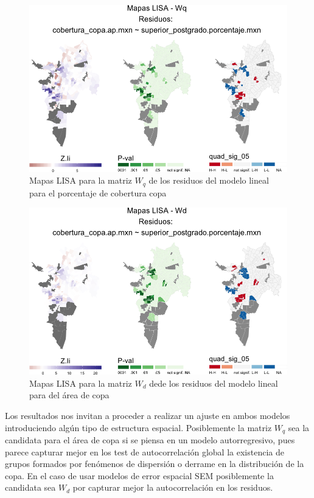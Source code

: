 \documentclass[12pt,]{book}
\begin{document}
\begin{figure}
\includegraphics[width=1\linewidth]{tesis-unigis_files/figure-latex/mapas-lisa-rescopaap-wq-1} \caption{Mapas LISA para la matriz $W_q$ de los residuos del modelo lineal para el porcentaje de cobertura copa}\label{fig:mapas-lisa-rescopaap-wq}
\end{figure}

\begin{figure}
\includegraphics[width=1\linewidth]{tesis-unigis_files/figure-latex/mapas-lisa-rescopaap-wd-1} \caption{Mapas LISA para la matriz $W_d$ dede los residuos del modelo lineal para del área de copa}\label{fig:mapas-lisa-rescopaap-wd}
\end{figure}

Los resultados nos invitan a proceder a realizar un ajuste en ambos
modelos introduciendo algún tipo de estructura espacial. Posiblemente la
matriz \(W_q\) sea la candidata para el área de copa si se piensa en un
modelo autorregresivo, pues parece capturar mejor en los test de
autocorrelación global la existencia de grupos formados por fenómenos de
dispersión o derrame en la distribución de la copa. En el caso de usar
modelos de error espacial SEM posiblemente la candidata sea \(W_d\) por
capturar mejor la autocorrelación en los residuos.
\end{document}
